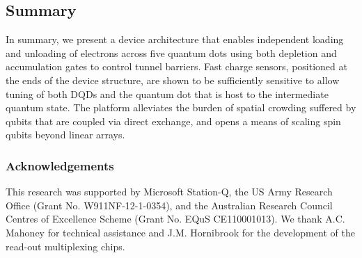 \subsection{Summary}
In summary, we present a device architecture that enables independent loading and unloading of electrons across five quantum dots using both depletion and accumulation gates to control tunnel barriers. Fast charge sensors, positioned at the ends of the device structure, are shown to be sufficiently sensitive to allow tuning of both DQDs and the quantum dot that is host to the intermediate quantum state. The platform alleviates the burden of spatial crowding suffered by qubits that are coupled via direct exchange, and opens a means of scaling spin qubits beyond linear arrays.

\subsubsection{Acknowledgements}
This research was supported by Microsoft Station-Q, the US Army Research Office (Grant No. W911NF-12-1-0354), and the Australian Research Council Centres of Excellence Scheme (Grant No. EQuS CE110001013). We thank A.C. Mahoney for technical assistance and J.M. Hornibrook for the development of the read-out multiplexing chips.

